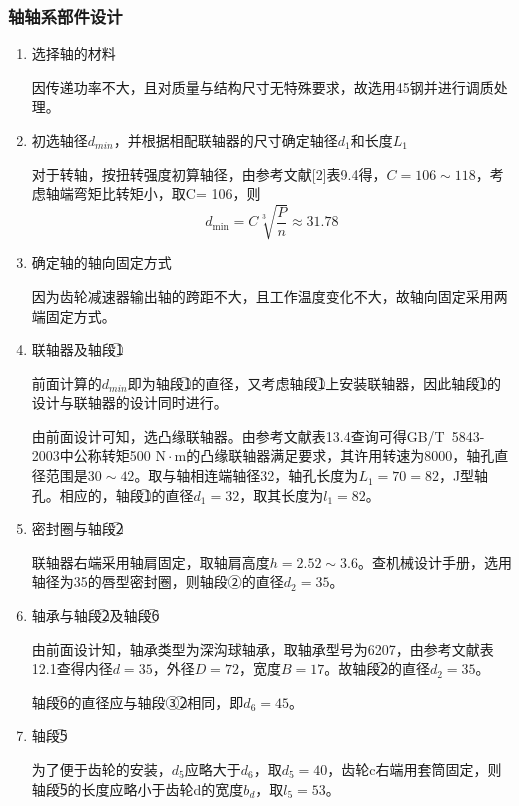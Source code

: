 \subsubsection{\uppercase\expandafter{}轴轴系部件设计}
\begin{enumerate}[i]
	\item 选择轴的材料
	\par 因传递功率不大，且对质量与结构尺寸无特殊要求，故选用45钢并进行调质处理。

	\item 初选轴径$d_{min}$，并根据相配联轴器的尺寸确定轴径$d_1$和长度$L_1$
	\par 对于转轴，按扭转强度初算轴径，由参考文献[2]表9.4得，$C=106\sim 118$，考虑轴端弯矩比转矩小，取C= 106，则$$d_{\min}=C\sqrt[3]{\frac{P}{n}}\approx 31.78$$

	\item 	确定轴的轴向固定方式
	\par 因为齿轮减速器输出轴的跨距不大，且工作温度变化不大，故轴向固定采用两端固定方式。
	
	\item 联轴器及轴段\textcircled{1}
	\par 前面计算的$d_{min}$即为轴段\textcircled{1}的直径，又考虑轴段\textcircled{1}上安装联轴器，因此轴段\textcircled{1}的设计与联轴器的设计同时进行。
	\par 由前面设计可知，选凸缘联轴器。由参考文献\cite{1}表13.4查询可得GB/T~5843-2003中公称转矩500 $\mathrm{N}\cdot \mathrm{m}$的凸缘联轴器满足要求，其许用转速为8000，轴孔直径范围是$30\sim 42$。取与轴相连端轴径32，轴孔长度为$L_1=70=82$，J型轴孔。相应的，轴段\textcircled{1}的直径$d_1=32$，取其长度为$l_1=82$。
	
	\item 密封圈与轴段\textcircled{2}
	\par 联轴器右端采用轴肩固定，取轴肩高度$h=2.52\sim 3.6$。查机械设计手册，选用轴径为35的唇型密封圈，则轴段②的直径$d_2=35$。
	
	\item 轴承与轴段\textcircled{2}及轴段\textcircled{6}
	\par 由前面设计知，轴承类型为深沟球轴承，取轴承型号为6207，由参考文献\cite{1}表12.1查得内径$d=35$，外径$D=72$，宽度$B=17$。故轴段\textcircled{2}的直径$d_2=35$。
	\par 轴段\textcircled{6}的直径应与轴段③\textcircled{2}相同，即$d_6=45$。
	
	\item 轴段\textcircled{5}
	\par 为了便于齿轮的安装，$d_5$应略大于$d_6$，取$d_5=40$，齿轮c右端用套筒固定，则轴段\textcircled{5}的长度应略小于齿轮d的宽度$b_d$，取$l_5=53$。
	

\end{enumerate}
